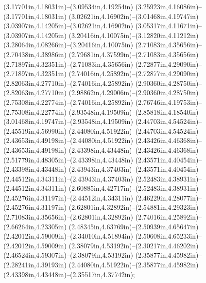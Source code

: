 (3.17701in,4.18031in)--(3.09534in,4.19254in) (3.25923in,4.16086in)--(3.17701in,4.18031in) (3.02621in,4.16902in)--(3.01468in,4.19747in) (3.03907in,4.14205in)--(3.02621in,4.16902in) (3.05317in,4.11671in)--(3.03907in,4.14205in) (3.20416in,4.10075in)--(3.12820in,4.11212in) (3.28064in,4.08266in)--(3.20416in,4.10075in) (2.71083in,4.35656in)--(2.70438in,4.38986in) (2.79681in,4.37599in)--(2.71083in,4.35656in) (2.71897in,4.32351in)--(2.71083in,4.35656in) (2.72877in,4.29090in)--(2.71897in,4.32351in) (2.74016in,4.25892in)--(2.72877in,4.29090in) (2.82063in,4.27710in)--(2.74016in,4.25892in) (2.90360in,4.28750in)--(2.82063in,4.27710in) (2.98862in,4.29006in)--(2.90360in,4.28750in) (2.75308in,4.22774in)--(2.74016in,4.25892in) (2.76746in,4.19753in)--(2.75308in,4.22774in) (2.93548in,4.19509in)--(2.85818in,4.18540in) (3.01468in,4.19747in)--(2.93548in,4.19509in) (2.44703in,4.54524in)--(2.45519in,4.56990in) (2.44080in,4.51922in)--(2.44703in,4.54524in) (2.43653in,4.49198in)--(2.44080in,4.51922in) (2.43426in,4.46368in)--(2.43653in,4.49198in) (2.43398in,4.43448in)--(2.43426in,4.46368in) (2.51779in,4.48305in)--(2.43398in,4.43448in) (2.43571in,4.40454in)--(2.43398in,4.43448in) (2.43943in,4.37403in)--(2.43571in,4.40454in) (2.44512in,4.34311in)--(2.43943in,4.37403in) (2.52483in,4.38931in)--(2.44512in,4.34311in) (2.60885in,4.42717in)--(2.52483in,4.38931in) (2.45276in,4.31197in)--(2.44512in,4.34311in) (2.46229in,4.28077in)--(2.45276in,4.31197in) (2.62801in,4.32892in)--(2.54881in,4.29323in) (2.71083in,4.35656in)--(2.62801in,4.32892in) (2.74016in,4.25892in)--(2.66264in,4.23305in) (2.48345in,4.63769in)--(2.50939in,4.65647in) (2.42012in,4.59009in)--(2.34010in,4.51894in) (2.50608in,4.65233in)--(2.42012in,4.59009in) (2.38079in,4.53192in)--(2.30217in,4.46202in) (2.46524in,4.59307in)--(2.38079in,4.53192in) (2.35877in,4.45982in)--(2.28241in,4.39193in) (2.44080in,4.51922in)--(2.35877in,4.45982in) (2.43398in,4.43448in)--(2.35517in,4.37742in);
